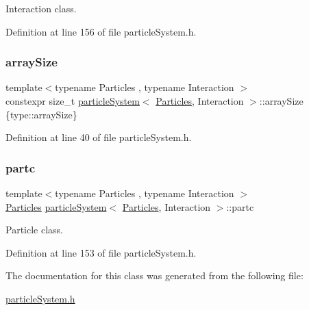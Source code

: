 Interaction class. 



Definition at line 156 of file particle\+System.\+h.

\mbox{\label{classparticle_system_a546e31d7390df18688216898c6f610f9}} 
\subsubsection{\texorpdfstring{array\+Size}{arraySize}}
{\footnotesize\ttfamily template$<$typename Particles , typename Interaction $>$ \\
constexpr size\+\_\+t \mbox{\hyperlink{classparticle_system}{particle\+System}}$<$ \mbox{\hyperlink{struct_particles}{Particles}}, Interaction $>$\+::array\+Size \{type\+::array\+Size\}\hspace{0.3cm}{\ttfamily [static]}}



Definition at line 40 of file particle\+System.\+h.

\mbox{\label{classparticle_system_a48cb24fbd9d72503a5e464a02760e814}} 
\subsubsection{\texorpdfstring{partc}{partc}}
{\footnotesize\ttfamily template$<$typename Particles , typename Interaction $>$ \\
\mbox{\hyperlink{struct_particles}{Particles}} \mbox{\hyperlink{classparticle_system}{particle\+System}}$<$ \mbox{\hyperlink{struct_particles}{Particles}}, Interaction $>$\+::partc\hspace{0.3cm}{\ttfamily [protected]}}



Particle class. 



Definition at line 153 of file particle\+System.\+h.



The documentation for this class was generated from the following file\+:\begin{DoxyCompactItemize}
\item 
\mbox{\hyperlink{particle_system_8h}{particle\+System.\+h}}\end{DoxyCompactItemize}
